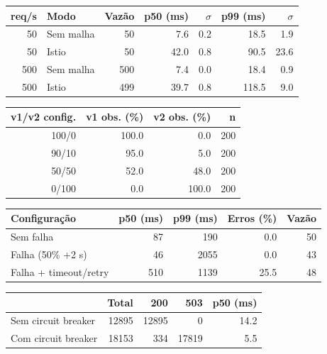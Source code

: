 \begin{tabular}{rlrrrrr}\hline
req/s & Modo & Vaz\~ao & p50 (ms) & $\sigma$ & p99 (ms) & $\sigma$ \\ \hline
50 & Sem malha & 50 & 7.6 & 0.2 & 18.5 & 1.9 \\
50 & Istio & 50 & 42.0 & 0.8 & 90.5 & 23.6 \\
500 & Sem malha & 500 & 7.4 & 0.0 & 18.4 & 0.9 \\
500 & Istio & 499 & 39.7 & 0.8 & 118.5 & 9.0 \\
\hline\end{tabular}

\begin{tabular}{rrrr}\hline
v1/v2 config. & v1 obs. (\%) & v2 obs. (\%) & n \\ \hline
100/0 & 100.0 & 0.0 & 200 \\
90/10 & 95.0 & 5.0 & 200 \\
50/50 & 52.0 & 48.0 & 200 \\
0/100 & 0.0 & 100.0 & 200 \\
\hline\end{tabular}

\begin{tabular}{lrrrr}\hline
Configura\c{c}\~ao & p50 (ms) & p99 (ms) & Erros (\%) & Vaz\~ao \\ \hline
Sem falha & 87 & 190 & 0.0 & 50 \\
Falha (50\% +2 s) & 46 & 2055 & 0.0 & 43 \\
Falha + timeout/retry & 510 & 1139 & 25.5 & 48 \\
\hline\end{tabular}

\begin{tabular}{lrrrr}\hline
 & Total & 200 & 503 & p50 (ms) \\ \hline
Sem circuit breaker & 12895 & 12895 & 0 & 14.2 \\
Com circuit breaker & 18153 & 334 & 17819 & 5.5 \\
\hline\end{tabular}

